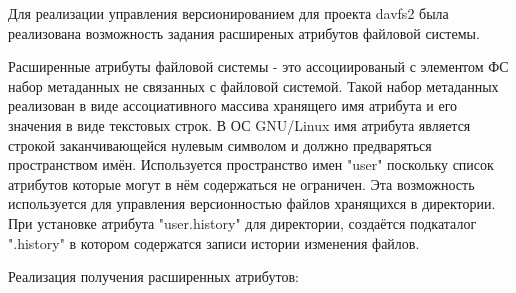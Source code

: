 \documentclass[utf8,usehyperref,12pt]{G7-32}
\begin{document}
Для реализации управления версионированием для проекта davfs2 была реализована возможность задания расширеных атрибутов файловой системы. 

Расширенные атрибуты файловой системы - это ассоциированый с элементом ФС набор метаданных не связанных с файловой системой. Такой набор метаданных реализован в виде ассоциативного массива хранящего имя атрибута и его значения в виде текстовых строк. В ОС GNU/Linux имя атрибута является строкой заканчивающейся нулевым символом и должно предваряться пространством имён. Используется пространство имен "user" поскольку список атрибутов которые могут в нём содержаться не ограничен. Эта возможность используется для управления версионностью файлов хранящихся в директории. При установке атрибута "user.history" для директории, создаётся подкаталог ".history" в котором содержатся записи истории изменения файлов.

Реализация получения расширенных атрибутов:
\end{document}
